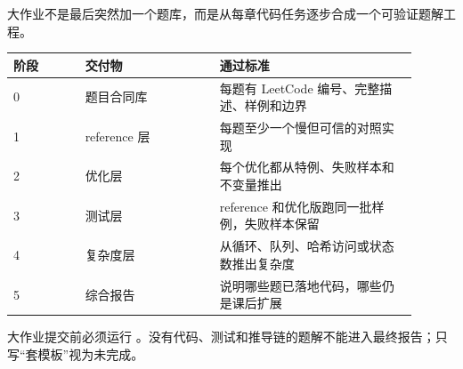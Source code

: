 大作业不是最后突然加一个题库，而是从每章代码任务逐步合成一个可验证题解工程。

\begin{longtable}{p{0.16\linewidth}p{0.30\linewidth}p{0.44\linewidth}}
阶段 & 交付物 & 通过标准 \\
\hline
0 & 题目合同库 & 每题有 LeetCode 编号、完整描述、样例和边界 \\
1 & reference 层 & 每题至少一个慢但可信的对照实现 \\
2 & 优化层 & 每个优化都从特例、失败样本和不变量推出 \\
3 & 测试层 & reference 和优化版跑同一批样例，失败样本保留 \\
4 & 复杂度层 & 从循环、队列、哈希访问或状态数推出复杂度 \\
5 & 综合报告 & 说明哪些题已落地代码，哪些仍是课后扩展 \\
\end{longtable}

\begin{labbox}
大作业提交前必须运行 。没有代码、测试和推导链的题解不能进入最终报告；只写“套模板”视为未完成。
\end{labbox}
